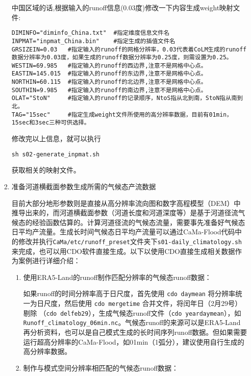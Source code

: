 \begin{enumerate}
中国区域的话,根据输入的runoff信息(0.03度)修改一下内容生成weight映射文件:
\begin{lstlisting}
DIMINFO="diminfo_China.txt"  #指定维度信息文件名
INPMAT="inpmat_China.bin"    #指定生成的插值文件名
GRSIZEIN=0.03   #指定输入的runoff的网格分辨率，0.03代表着CoLM生成的runoff数据分辨率为0.03度，如果生成的runoff数据分辨率为0.25度，则需设置为0.25。
WESTIN=69.985   #指定输入的runoff的西边界,注意不是网格中心点。
EASTIN=145.015  #指定输入的runoff的东边界,注意不是网格中心点。
NORTHIN=60.115  #指定输入的runoff的北边界,注意不是网格中心点。
SOUTHIN=9.985   #指定输入的runoff的南边界,注意不是网格中心点。
OLAT="StoN"     #指定输入的runoff的记录顺序，NtoS指从北到南，StoN指从南到北。
TAG="15sec"     #指定生成weight文件所使用的高分辨率数据，目前有01min，15sec和3sec三种可供选择。
\end{lstlisting}

修改完以上信息，就可以执行
\begin{lstlisting}
sh s02-generate_inpmat.sh
\end{lstlisting}
获取相关的映射文件。

\item 准备河道横截面参数生成所需的气候态产流数据

目前大部分地形参数则是直接从高分辨率流向图和数字高程模型（DEM）中推导出来的，而河道横截面参数（河道长度和河道深度等）是基于河道径流气候态的经验函数估算的。计算河道径流的气候态流量，需要事先准备好气候态日平均产流量。生成长时间气候态日平均产流量可以通过CaMa-Flood代码中的修改并执行\texttt{CaMa/etc/runoff\_preset}文件夹下\texttt{s01-daily\_climatology.sh}来完成，也可以用CDO软件直接生成。以下以使用CDO直接生成相关数据作为案例进行详细介绍：
\begin{enumerate}
%
\item 使用ERA5-Land的runoff制作匹配分辨率的气候态runoff数据：

如果runoff的时间分辨率高于日尺度，首先使用 \verb|cdo daymean| 将分辨率统一为日尺度，然后使用 \verb|cdo mergetime| 合并文件，将闰年日（2月29号）剔除 （\verb|cdo delfeb29|），生成气候态runoff文件（\verb|cdo yeardaymean|），如\texttt{Runoff\_climatology\_06min.nc}。气候态runoff的来源可以是ERA5-Land再分析资料，也可以是自己模式生成的长时间序列runoff数据。但如果需要运行超高分辨率的CaMa-Flood，如01min（1弧分），建议使用自行生成的高分辨率数据。


\item 制作与模式空间分辨率相匹配的气候态runoff数据：


\end{enumerate}
\end{enumerate}

